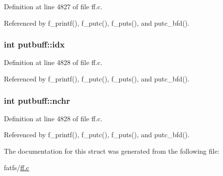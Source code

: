 Definition at line 4827 of file ff.\+c.



Referenced by f\+\_\+printf(), f\+\_\+putc(), f\+\_\+puts(), and putc\+\_\+bfd().

\subsubsection[{\texorpdfstring{idx}{idx}}]{\setlength{\rightskip}{0pt plus 5cm}int putbuff\+::idx}\hypertarget{structputbuff_a10a3ca93af8df07e9836ebd5230c06d8}{}\label{structputbuff_a10a3ca93af8df07e9836ebd5230c06d8}


Definition at line 4828 of file ff.\+c.



Referenced by f\+\_\+printf(), f\+\_\+putc(), f\+\_\+puts(), and putc\+\_\+bfd().

\subsubsection[{\texorpdfstring{nchr}{nchr}}]{\setlength{\rightskip}{0pt plus 5cm}int putbuff\+::nchr}\hypertarget{structputbuff_a125366bfe48077e6f562f95e30b4604a}{}\label{structputbuff_a125366bfe48077e6f562f95e30b4604a}


Definition at line 4828 of file ff.\+c.



Referenced by f\+\_\+printf(), f\+\_\+putc(), f\+\_\+puts(), and putc\+\_\+bfd().



The documentation for this struct was generated from the following file\+:\begin{DoxyCompactItemize}
\item 
fatfs/\hyperlink{ff_8c}{ff.\+c}\end{DoxyCompactItemize}
